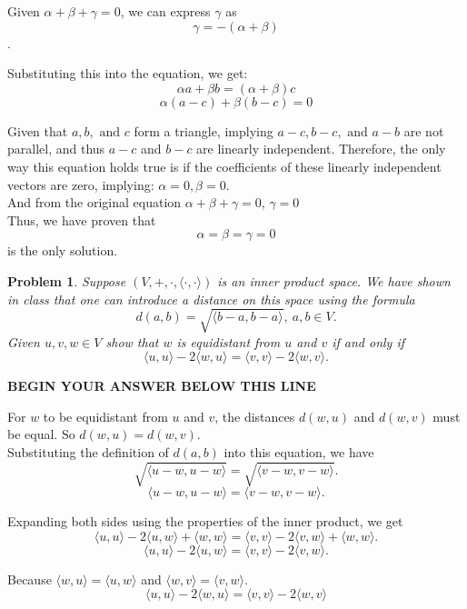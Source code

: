 \documentclass[letter,12pt]{article}
\newtheorem{problem}[main_theorem]{Problem}
\newcommand{\answerspacetop}{
	\begin{center}
		\textbf{BEGIN YOUR ANSWER BELOW THIS LINE} \\ \hrulefill
	\end{center}
}
\begin{document}
Given $\alpha + \beta + \gamma = 0$, we can express $\gamma$ as $$\gamma = -(\alpha + \beta)$$.

Substituting this into the equation, we get:
$$\alpha a + \beta b = (\alpha + \beta) c$$
$$\alpha (a - c) + \beta (b - c) = 0$$

Given that $a, b, \text{ and } c$ form a triangle, implying $a - c, b - c, \text{ and } a - b$ are not parallel, and thus $a - c$ and $b - c$ are linearly independent. Therefore, the only way this equation holds true is if the coefficients of these linearly independent vectors are zero, implying: $\alpha = 0, \beta = 0$.\\

And from the original equation $\alpha + \beta + \gamma = 0$, $\gamma = 0$\\

Thus, we have proven that $$\alpha = \beta = \gamma = 0$$ is the only solution. 
\pagebreak


\begin{problem} Suppose $(V,+,\cdot,\langle\cdot,\cdot\rangle)$ is an inner product space. We have shown in class that one can introduce a distance on this space using the formula
$$d(a,b)=\sqrt{\langle b-a,b-a \rangle}, \ a,b \in V.$$
Given $u,v,w \in V$ show that $w$ is equidistant from $u$ and $v$ if and only if
$$\langle u,u \rangle - 2\langle w,u \rangle=\langle v,v \rangle - 2\langle w,v \rangle.$$
\end{problem}

\answerspacetop

For $w$ to be equidistant from $u$ and $v$, the distances $d(w,u)$ and $d(w,v)$ must be equal. So $d(w,u) = d(w,v).$\\

Substituting the definition of $d(a,b)$ into this equation, we have
$$
\sqrt{\langle u-w, u-w \rangle} = \sqrt{\langle v-w, v-w \rangle}.
$$
$$
\langle u-w, u-w \rangle = \langle v-w, v-w \rangle.
$$

Expanding both sides using the properties of the inner product, we get
$$
\langle u,u \rangle - 2\langle u,w \rangle + \langle w,w \rangle = \langle v,v \rangle - 2\langle v,w \rangle + \langle w,w \rangle.
$$
$$
\langle u,u \rangle - 2\langle u,w \rangle = \langle v,v \rangle - 2\langle v,w \rangle.
$$

Because $\langle w,u \rangle = \langle u,w \rangle$ and $\langle w,v \rangle = \langle v,w \rangle$. 
$$
\langle u,u \rangle - 2\langle w,u \rangle = \langle v,v \rangle - 2\langle w,v \rangle
$$
\end{document}
